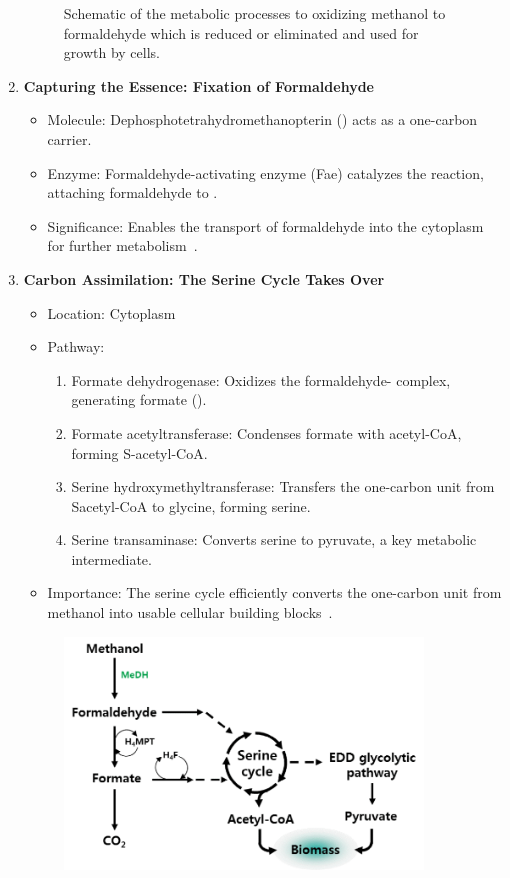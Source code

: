 \begin{enumerate}
\begin{figure}[H]
        \caption{Schematic of the metabolic processes to oxidizing methanol to formaldehyde which is reduced or eliminated and used for growth by cells.}
        \label{fig:mextorquens_metabolism_methanol}
    \end{figure}
    \item \textbf{Capturing the Essence: Fixation of Formaldehyde}
    \begin{itemize}
        \item Molecule: Dephosphotetrahydromethanopterin () acts as a one-carbon
        carrier.
        \item Enzyme: Formaldehyde-activating enzyme (Fae) catalyzes the reaction, attaching
        formaldehyde to \@.
        \item Significance: Enables the transport of formaldehyde into the cytoplasm for
        further metabolism~\cite{methanol_metabolism}.
    \end{itemize}
    \item \textbf{Carbon Assimilation: The Serine Cycle Takes Over}
    \begin{itemize}
        \item Location: Cytoplasm
        \item Pathway:
        \begin{enumerate}
            \item Formate dehydrogenase:
            Oxidizes the formaldehyde- complex, generating formate ().
            \item Formate acetyltransferase:
            Condenses formate with acetyl-CoA, forming S-acetyl-CoA\@.
            \item Serine hydroxymethyltransferase: Transfers the one-carbon unit from Sacetyl-CoA to glycine, forming serine.
            \item Serine transaminase: Converts serine to pyruvate, a key metabolic
            intermediate.
        \end{enumerate}
        \item Importance: The serine cycle efficiently converts the one-carbon unit from
        methanol into usable cellular building blocks~\cite{methanol_metabolism}.
    \end{itemize}
    \begin{figure}[H]
        \centering
        \includegraphics[width=0.9\textwidth]{./media/images/mextorquens_metabolizing_methanol}

\end{figure}
\end{enumerate}
